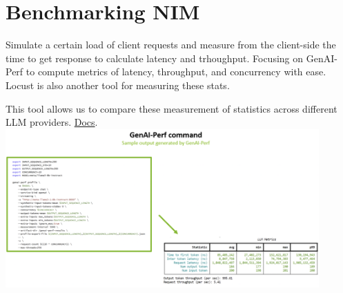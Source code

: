 \documentclass{article}
\begin{document}
\section{Benchmarking NIM}
Simulate a certain load of client requests and measure from the client-side the time to get response to calculate latency and trhoughput. Focusing on GenAI-Perf to compute metrics of latency, throughput, and concurrency with ease. Locust is also another tool for measuring these stats. 

This tool allows us to compare these measurement of statistics across different LLM providers. \href{https://docs.nvidia.com/nim/benchmarking/llm/latest/index.html}{Docs}. \\\includegraphics[width=0.9\textwidth]{../images/exampleGenAIperfOutput.png}\\
\end{document}
